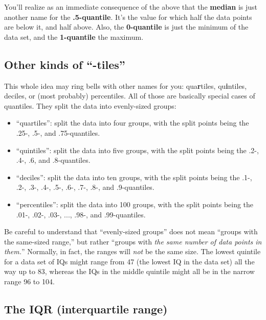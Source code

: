 
You'll realize as an immediate consequence of the above that the
\textbf{median} is just another name for the \textbf{.5-quantile}. It's the
value for which half the data points are below it, and half above. Also, the
\textbf{0-quantile} is just the minimum of the data set, and the
\textbf{1-quantile} the maximum.

\subsection{Other kinds of ``-tiles''}

This whole idea may ring bells with other names for you: qua\textbf{r}tiles,
qu\textbf{i}ntiles, deciles, or (most probably) percentiles. All of those are
basically special cases of quantiles. They split the data into evenly-sized
groups:


\begin{itemize}[nosep]
\item ``quartiles'': split the data into four groups, with the split points
being the .25-, .5-, and .75-quantiles.
\item ``quintiles'': split the data into five groups, with the split points
being the .2-, .4-, .6, and .8-quantiles.
\item ``deciles'': split the data into ten groups, with the split points
being the .1-, .2-, .3-, .4-, .5-, .6-, .7-, .8-, and .9-quantiles.
\item ``percentiles'': split the data into 100 groups, with the split points
being the .01-, .02-, .03-, ..., .98-, and .99-quantiles.
\end{itemize}

Be careful to understand that ``evenly-sized groups'' does not mean ``groups
with the same-sized range,'' but rather ``groups with \textit{the same number
of data points in them.}'' Normally, in fact, the ranges will \textit{not} be
the same size. The lowest quintile for a data set of IQs might range from 47
(the lowest IQ in the data set) all the way up to 83, whereas the IQs in the
middle quintile might all be in the narrow range 96 to 104.

\subsection{The IQR (interquartile range)}

